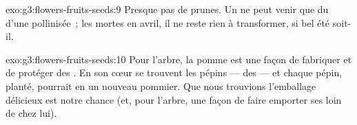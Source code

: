 \begin{solution}{exo:g3:flowers-fruits-seeds:9}
Presque pas de prunes. Un  ne peut venir que du  d'une
 pollinisée~; les  mortes en avril, il ne reste rien à
transformer, si bel été soit-il.
\end{solution}

\begin{solution}{exo:g3:flowers-fruits-seeds:10}
Pour l'arbre, la pomme est une façon de fabriquer et de protéger des
. En son cœur se trouvent les pépins --- des  --- et
chaque pépin, planté, pourrait  en un nouveau pommier. Que
nous trouvions l'emballage délicieux est notre chance (et, pour
l'arbre, une façon de faire emporter ses  loin de chez lui).
\end{solution}
